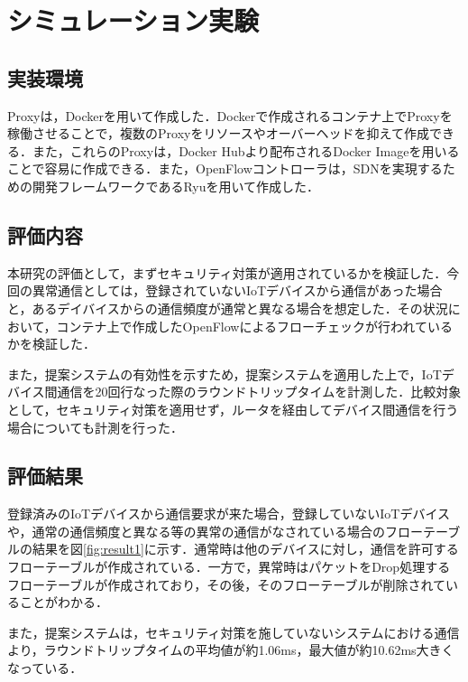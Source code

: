 \documentclass[a4paper,10pt,twocolumn,uplatex]{jsarticle}
\begin{document}
\section{シミュレーション実験}
\subsection{実装環境}
Proxyは，Dockerを用いて作成した．Dockerで作成されるコンテナ上でProxyを稼働させることで，複数のProxyをリソースやオーバーヘッドを抑えて作成できる．また，これらのProxyは，Docker Hubより配布されるDocker Imageを用いることで容易に作成できる．また，OpenFlowコントローラは，SDNを実現するための開発フレームワークであるRyuを用いて作成した．

\subsection{評価内容}
本研究の評価として，まずセキュリティ対策が適用されているかを検証した．今回の異常通信としては，登録されていないIoTデバイスから通信があった場合と，あるデイバイスからの通信頻度が通常と異なる場合を想定した．その状況において，コンテナ上で作成したOpenFlowによるフローチェックが行われているかを検証した．\par
また，提案システムの有効性を示すため，提案システムを適用した上で，IoTデバイス間通信を20回行なった際のラウンドトリップタイムを計測した．比較対象として，セキュリティ対策を適用せず，ルータを経由してデバイス間通信を行う場合についても計測を行った．





\subsection{評価結果}
登録済みのIoTデバイスから通信要求が来た場合，登録していないIoTデバイスや，通常の通信頻度と異なる等の異常の通信がなされている場合のフローテーブルの結果を図\ref{fig:result1}に示す．通常時は他のデバイスに対し，通信を許可するフローテーブルが作成されている．一方で，異常時はパケットをDrop処理するフローテーブルが作成されており，その後，そのフローテーブルが削除されていることがわかる．\par
また，提案システムは，セキュリティ対策を施していないシステムにおける通信より，ラウンドトリップタイムの平均値が約1.06ms，最大値が約10.62ms大きくなっている．
\end{document}
